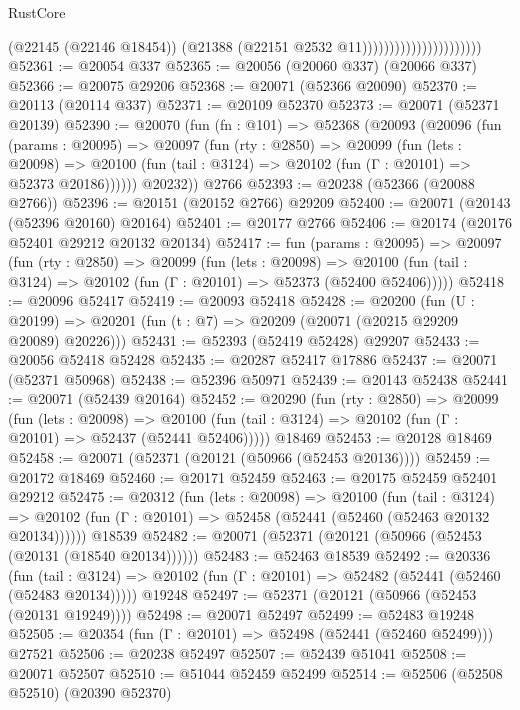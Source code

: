 \begin{lexlean}{RustCore}
\begin{coremodule}
                                            (@22145 (@22146 @18454))
                                            (@21388 (@22151 @2532 @11))))))))))))))))))))))
@52361 := @20054 @337
@52365 := @20056 (@20060 @337) (@20066 @337)
@52366 := @20075 @29206
@52368 := @20071 (@52366 @20090)
@52370 := @20113 (@20114 @337)
@52371 := @20109 @52370
@52373 := @20071 (@52371 @20139)
@52390 := @20070
    (fun (fn : @101) =>
    @52368
      (@20093
        (@20096
          (fun (params : @20095) =>
          @20097
            (fun (rty : @2850) =>
            @20099
              (fun (lets : @20098) =>
              @20100 (fun (tail : @3124) => @20102 (fun (Γ : @20101) => @52373 @20186))))))
        @20232))
    @2766
@52393 := @20238 (@52366 (@20088 @2766))
@52396 := @20151 (@20152 @2766) @29209
@52400 := @20071 (@20143 (@52396 @20160) @20164)
@52401 := @20177 @2766
@52406 := @20174 (@20176 @52401 @29212 @20132 @20134)
@52417 := fun (params : @20095) =>
  @20097
    (fun (rty : @2850) =>
    @20099
      (fun (lets : @20098) =>
      @20100 (fun (tail : @3124) => @20102 (fun (Γ : @20101) => @52373 (@52400 @52406)))))
@52418 := @20096 @52417
@52419 := @20093 @52418
@52428 := @20200
    (fun (U : @20199) => @20201 (fun (t : @7) => @20209 (@20071 (@20215 @29209 @20089) @20226)))
@52431 := @52393 (@52419 @52428) @29207
@52433 := @20056 @52418 @52428
@52435 := @20287 @52417 @17886
@52437 := @20071 (@52371 @50968)
@52438 := @52396 @50971
@52439 := @20143 @52438
@52441 := @20071 (@52439 @20164)
@52452 := @20290
    (fun (rty : @2850) =>
    @20099
      (fun (lets : @20098) =>
      @20100 (fun (tail : @3124) => @20102 (fun (Γ : @20101) => @52437 (@52441 @52406)))))
    @18469
@52453 := @20128 @18469
@52458 := @20071 (@52371 (@20121 (@50966 (@52453 @20136))))
@52459 := @20172 @18469
@52460 := @20171 @52459
@52463 := @20175 @52459 @52401 @29212
@52475 := @20312
    (fun (lets : @20098) =>
    @20100
      (fun (tail : @3124) =>
      @20102 (fun (Γ : @20101) => @52458 (@52441 (@52460 (@52463 @20132 @20134))))))
    @18539
@52482 := @20071 (@52371 (@20121 (@50966 (@52453 (@20131 (@18540 @20134))))))
@52483 := @52463 @18539
@52492 := @20336
    (fun (tail : @3124) => @20102 (fun (Γ : @20101) => @52482 (@52441 (@52460 (@52483 @20134)))))
    @19248
@52497 := @52371 (@20121 (@50966 (@52453 (@20131 @19249))))
@52498 := @20071 @52497
@52499 := @52483 @19248
@52505 := @20354 (fun (Γ : @20101) => @52498 (@52441 (@52460 @52499))) @27521
@52506 := @20238 @52497
@52507 := @52439 @51041
@52508 := @20071 @52507
@52510 := @51044 @52459 @52499
@52514 := @52506 (@52508 @52510) (@20390 @52370)

\end{coremodule}
\end{lexlean}
